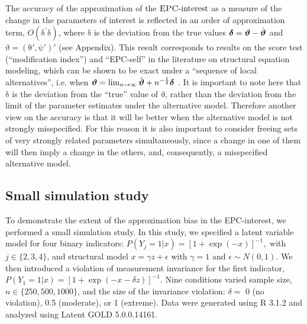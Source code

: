\documentclass[letterpaper,12pt]{article}
\newcommand\vm[1]{%
\bm{\mathrm{#1}}}
\newcommand{\param}{\vm{\theta}}
\newcommand{\bpsi}{\vm{\psi}}
\newcommand{\da}{\textrm{{\sc {EPC}}-interest}}
\begin{document}
The accuracy of the approximation of the $\da{}$ as a measure of the change in the parameters of interest is reflected in an order of approximation term, $O(\vm{\delta}^\prime\vm{\delta})$, where $\vm{\delta}$ is the deviation from the true values  $\vm{\delta} = \vm{\vartheta} - \hat{\vm{\vartheta}}$ and $\vm{\vartheta} = (\param', \bpsi')'$ (see Appendix).  This result corresponds to results on the score test (``modification index'') and ``EPC-self'' in the literature on structural equation modeling, which can be shown to be exact under a ``sequence of local alternatives'', i.e. when $\vm{\vartheta} = \lim_{n\rightarrow\infty} \hat{\vm{\vartheta}} + n^{-\frac{1}{2}}\vm{\delta}$ \citep[p. 135]{satorra1989alternative}.
It is important to note here that $\vm{\delta}$ is the deviation from the ``true'' value of $\vm{\vartheta}$, rather than the deviation from the limit of the parameter estimates under the alternative model. Therefore another view on the accuracy is that it will be better when the alternative model is not strongly misspecified. For this reason it is also important to consider freeing sets of very strongly related parameters simultaneously, since a change in one of them will then imply a change in the others, and, consequently, a misspecified alternative model. 

\subsection{Small simulation study}
\label{sec:simulation}

To demonstrate the extent of the approximation bias in the EPC-interest, we performed a small simulation study. In this study, we specified a latent variable model for four binary indicators:
$
	P(Y_j = 1 | x) = [1 + \exp(-x)]^{-1},
$
with $j \in \{2,3,4\}$, and structural model
$
	x = \gamma z + \epsilon
$
with $\gamma = 1$ and $\epsilon \sim N(0, 1)$. We then introduced a violation of measurement invariance for the first indicator,
$
	P(Y_1 = 1 | x) = [1 + \exp(-x - \delta z)]^{-1}.
$
Nine conditions varied sample size, $n \in \{250, 500, 1000\}$, and the size of the invariance violation:  $\delta = $ 0 (no violation), 0.5 (moderate), or 1 (extreme). 
Data were generated using R 3.1.2 and analyzed using Latent GOLD 5.0.0.14161. 
\end{document}
